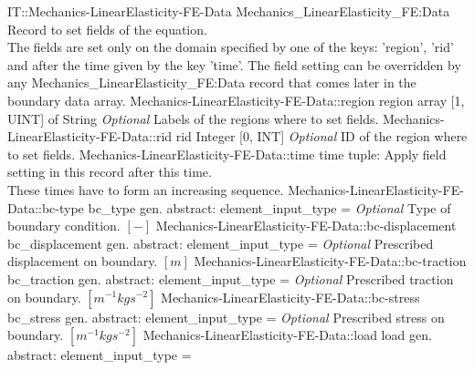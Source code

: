 \begin{RecordType}
	{IT::Mechanics-LinearElasticity-FE-Data}
	{Mechanics{\_}LinearElasticity{\_}FE:Data}
	{}%
	{}%
	{{{Record to set fields of the equation.}\\{
The fields are set only on the domain specified by one of the keys: 'region', 'rid'}\\{
and after the time given by the key 'time'. The field setting can be overridden by}\\{
 any Mechanics{\_}LinearElasticity{\_}FE:Data record that comes later in the boundary data array.}%
}}
		\RecKey
			{Mechanics-LinearElasticity-FE-Data::region}
			{region}
			{{array [1, UINT] of }{String}}{}
			{ \it{Optional}}
			{{{Labels of the regions where to set fields. }%
}}
		\RecKey
			{Mechanics-LinearElasticity-FE-Data::rid}
			{rid}
			{{Integer [0, INT]}}{}
			{ \it{Optional}}
			{{{ID of the region where to set fields.}%
}}
		\RecKey
			{Mechanics-LinearElasticity-FE-Data::time}
			{time}
			{{tuple: }}{}
			{ }
			{{{Apply field setting in this record after this time.}\\{
These times have to form an increasing sequence.}%
}}
		\RecKey
			{Mechanics-LinearElasticity-FE-Data::bc-type}
			{bc{\_}type}
			{{gen. abstract: }}{{element{\_}input{\_}type}{ = }}
			{ \it{Optional}}
			{{{Type of boundary condition. }{$[-]$}%
}}
		\RecKey
			{Mechanics-LinearElasticity-FE-Data::bc-displacement}
			{bc{\_}displacement}
			{{gen. abstract: }}{{element{\_}input{\_}type}{ = }}
			{ \it{Optional}}
			{{{Prescribed displacement on boundary. }{$[m]$}%
}}
		\RecKey
			{Mechanics-LinearElasticity-FE-Data::bc-traction}
			{bc{\_}traction}
			{{gen. abstract: }}{{element{\_}input{\_}type}{ = }}
			{ \it{Optional}}
			{{{Prescribed traction on boundary. }{$[m^{-1}kgs^{-2}]$}%
}}
		\RecKey
			{Mechanics-LinearElasticity-FE-Data::bc-stress}
			{bc{\_}stress}
			{{gen. abstract: }}{{element{\_}input{\_}type}{ = }}
			{ \it{Optional}}
			{{{Prescribed stress on boundary. }{$[m^{-1}kgs^{-2}]$}%
}}
		\RecKey
			{Mechanics-LinearElasticity-FE-Data::load}
			{load}
			{{gen. abstract: }}{{element{\_}input{\_}type}{ = }}

\end{RecordType}
